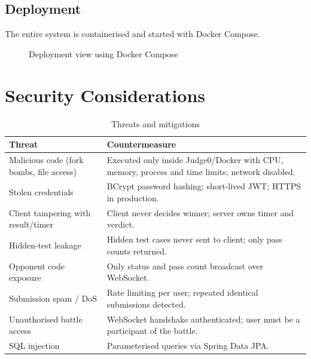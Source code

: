 \documentclass[12pt,a4paper,oneside]{report}
\begin{document}
\section{Deployment}
The entire system is containerised and started with Docker Compose.
\begin{figure}[H]
\centering
{}
\caption{Deployment view using Docker Compose}
\end{figure}

\chapter{Security Considerations}
\begin{table}[H]
\centering
\small
\begin{tabularx}{\textwidth}{@{}lX@{}}
\toprule
\textbf{Threat} & \textbf{Countermeasure} \\
\midrule
Malicious code (fork bombs, file access) & Executed only inside Judge0/Docker with CPU, memory, process and time limits; network disabled. \\
Stolen credentials & BCrypt password hashing; short-lived JWT; HTTPS in production. \\
Client tampering with result/timer & Client never decides winner; server owns timer and verdict. \\
Hidden-test leakage & Hidden test cases never sent to client; only pass counts returned. \\
Opponent code exposure & Only status and pass count broadcast over WebSocket. \\
Submission spam / DoS & Rate limiting per user; repeated identical submissions detected. \\
Unauthorised battle access & WebSocket handshake authenticated; user must be a participant of the battle. \\
SQL injection & Parameterised queries via Spring Data JPA. \\
\bottomrule
\end{tabularx}
\caption{Threats and mitigations}
\end{table}
\end{document}
